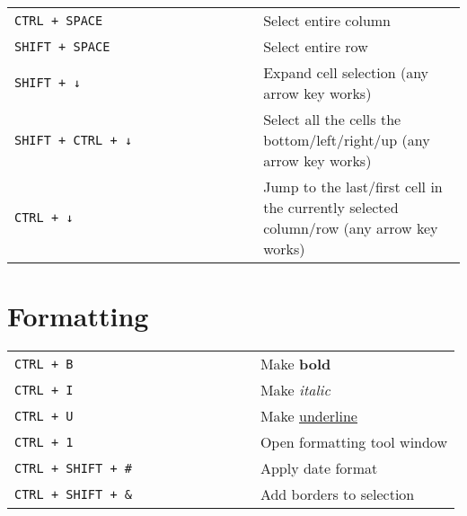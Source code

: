 \documentclass[8pt]{extarticle} %
\begin{document}
\begin{multicols}{2}
  \begin{tabular}{L{0.55\linewidth} L{0.45\linewidth}}

    \tt CTRL + SPACE            & Select entire column \\
    \tt SHIFT + SPACE           & Select entire row \\
    \tt SHIFT + ↓               & Expand cell selection (any arrow key works) \\
    \tt SHIFT + CTRL + ↓        & Select all the cells the bottom/left/right/up (any arrow key works) \\
    \tt CTRL + ↓                & Jump to the last/first cell in the currently selected column/row (any arrow key works) \\

  \end{tabular}


\section{Formatting}

  \begin{tabular}{L{0.55\linewidth} L{0.45\linewidth}}
    
    \tt CTRL + B                & Make \textbf{bold} \\
    \tt CTRL + I                & Make \textit{italic} \\
    \tt CTRL + U                & Make \underline{underline} \\
    \tt CTRL + 1                & Open formatting tool window \\
    \tt CTRL + SHIFT + \#       & Apply date format \\
    \tt CTRL + SHIFT + \&       & Add borders to selection \\
    
  \end{tabular}


\end{multicols}
\end{document}
